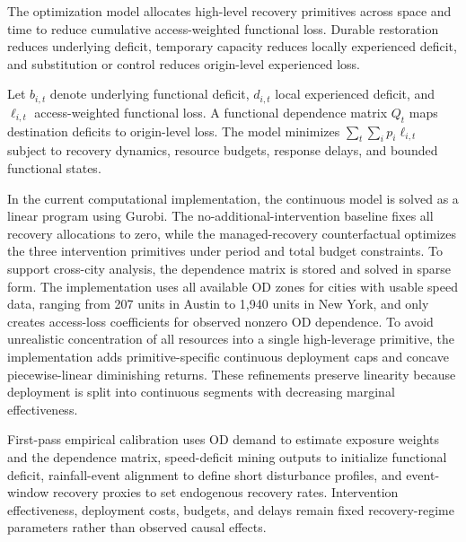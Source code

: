 The optimization model allocates high-level recovery primitives across space and time to reduce cumulative access-weighted functional loss. Durable restoration reduces underlying deficit, temporary capacity reduces locally experienced deficit, and substitution or control reduces origin-level experienced loss.

Let $b_{i,t}$ denote underlying functional deficit, $d_{i,t}$ local experienced deficit, and $\ell_{i,t}$ access-weighted functional loss. A functional dependence matrix $Q_t$ maps destination deficits to origin-level loss. The model minimizes $\sum_t \sum_i p_i \ell_{i,t}$ subject to recovery dynamics, resource budgets, response delays, and bounded functional states.

In the current computational implementation, the continuous model is solved as a linear program using Gurobi. The no-additional-intervention baseline fixes all recovery allocations to zero, while the managed-recovery counterfactual optimizes the three intervention primitives under period and total budget constraints. To support cross-city analysis, the dependence matrix is stored and solved in sparse form. The implementation uses all available OD zones for cities with usable speed data, ranging from 207 units in Austin to 1,940 units in New York, and only creates access-loss coefficients for observed nonzero OD dependence. To avoid unrealistic concentration of all resources into a single high-leverage primitive, the implementation adds primitive-specific continuous deployment caps and concave piecewise-linear diminishing returns. These refinements preserve linearity because deployment is split into continuous segments with decreasing marginal effectiveness.

First-pass empirical calibration uses OD demand to estimate exposure weights and the dependence matrix, speed-deficit mining outputs to initialize functional deficit, rainfall-event alignment to define short disturbance profiles, and event-window recovery proxies to set endogenous recovery rates. Intervention effectiveness, deployment costs, budgets, and delays remain fixed recovery-regime parameters rather than observed causal effects.
